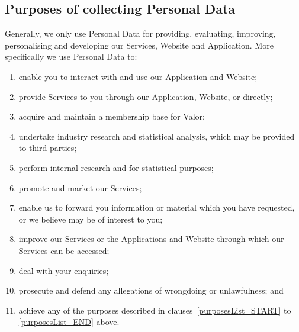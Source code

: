 \documentclass[10pt]{article}
\begin{document}
\subsection{Purposes of collecting Personal Data}
\label{purposes}
Generally, we only use Personal Data for providing, evaluating, improving, personalising and developing our Services, Website and Application. More specifically we use Personal Data to:
\begin{enumerate}[(1)]
	\item enable you to interact with and use our Application and Website; \label{purposesList_START}

	\item provide Services to you through our Application, Website, or directly;

	\item acquire and maintain a membership base for Valor;

	\item undertake industry research and statistical analysis, which may be provided to third parties;

	\item perform internal research and for statistical purposes;

	\item promote and market our Services;

	\item enable us to forward you information or material which you have requested, or we believe may be of interest to you;

	\item improve our Services or the Applications and Website through which our Services can be accessed;

	\item deal with your enquiries; \label{purposesList_END}

	\item prosecute and defend any allegations of wrongdoing or unlawfulness; and

	\item achieve any of the purposes described in clauses~\ref{purposesList_START} to \ref{purposesList_END} above.
\end{enumerate}
\end{document}
